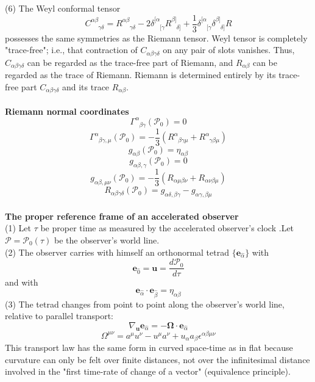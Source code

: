 \documentclass{article}
\begin{document}
(6) The Weyl conformal tensor
\[C^{\alpha \beta}_{\phantom{\alpha \beta} \gamma \delta} = R^{\alpha \beta}_{\phantom{\alpha \beta} \gamma \delta} -2 \delta^{[\alpha}_{\phantom{[\alpha}[\gamma} R^{\beta]}_{\phantom{\beta]}\delta]} + \frac{1}{3} \delta^{[\alpha}_{\phantom{[\alpha}[\gamma} \delta^{\beta]}_{\phantom{\beta]}\delta]} R \]
possesses the same symmetries as the Riemann tensor. 
Weyl tensor is completely "trace-free"; i.e., that
contraction of $C_{\alpha \beta \gamma \delta}$ on any pair of slots vanishes. Thus, $C_{\alpha \beta \gamma \delta}$ can be regarded as the trace-free part of Riemann, and $R_{\alpha \beta}$ can be regarded as the trace of Riemann. Riemann is determined entirely by its trace-free part $C_{\alpha \beta \gamma \delta}$ and
its trace $R_{\alpha \beta}$.\\ \\
\textbf{Riemann normal coordinates}
\[\Gamma^{\alpha}_{\phantom{\alpha} \beta \gamma}(\mathcal{P}_0) = 0\]
\[\Gamma^{\alpha}_{\phantom{\alpha} \beta \gamma,\mu}(\mathcal{P}_0) = -\frac{1}{3} (R^{\alpha}_{\phantom{\alpha} \beta \gamma \mu} + R^{\alpha}_{\phantom{\alpha} \gamma \beta \mu})\]
\[g_{\alpha \beta}(\mathcal{P}_0) = \eta_{\alpha \beta}\]
\[g_{\alpha \beta,\gamma}(\mathcal{P}_0) = 0\]
\[g_{\alpha \beta,\mu \nu}(\mathcal{P}_0) = -\frac{1}{3} (R_{\alpha \mu \beta \nu} +R_{\alpha \nu \beta \mu})\]
\[R_{\alpha \beta \gamma \delta}(\mathcal{P}_0) = g_{\alpha \delta, \beta \gamma} - g_{\alpha \gamma , \beta \mu}\]\\
\textbf{The proper reference frame of an accelerated observer}\\
(1) Let $\tau$ be proper time as measured by the accelerated observer's clock .Let $\mathcal{P} = \mathcal{P}_0(\tau)$ be the observer's world line.\\
(2) The observer carries with himself an orthonormal tetrad $\{\mathbf{e}_{\hat{\alpha}}\}$
with
\[\mathbf{e}_{\hat{0}} = \mathbf{u} = \frac{d \mathcal{P}_0}{d \tau}\]
and with
\[\mathbf{e}_{\hat{\alpha}} \cdot \mathbf{e}_{\hat{\beta}} = \eta_{\alpha \beta}\]
(3) The tetrad changes from point to point along the observer's world line, relative to parallel transport:
\[\nabla_{\mathbf{u}} \mathbf{e}_{\hat{\alpha}} = - \mathbf{\Omega} \cdot \mathbf{e}_{\hat{\alpha}} \]
\[\Omega^{\mu \nu} = a^{\mu} u^{\nu} - u^{\mu} a^{\nu} + u_{\alpha} a_{\beta}\epsilon^{\alpha \beta \mu \nu}\]
This transport law has the same form in curved space-time as in flat because curvature can only be felt over finite distances, not over
the infinitesimal distance involved in the "first time-rate of change of a vector" (equivalence principle).
\end{document}
